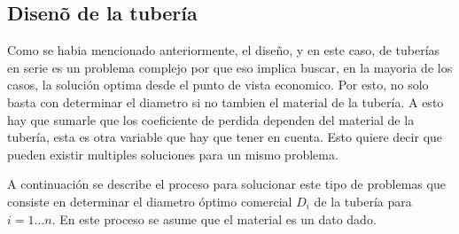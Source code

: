 \documentclass[11pt, oneside]{article}
\begin{document}
\subsection{Disen\~o de la  tuber\'ia}
Como se habia mencionado anteriormente, el dise\~no, y en este caso, de tuber\'ias en serie es un problema complejo por que eso implica buscar, en la mayoria de los casos, la soluci\'on optima desde el punto de vista economico. Por esto, no solo basta con determinar el diametro si no tambien el material de la tuber\'ia. A esto hay que sumarle que los coeficiente de perdida dependen del material de la tuber\'ia, esta es otra variable que hay que tener en cuenta. Esto quiere decir que pueden existir multiples soluciones para un mismo problema. 

A continuaci\'on se describe el proceso para solucionar este tipo de problemas que consiste en determinar el diametro \'optimo comercial $D_i$ de la tuber\'ia para $i=1...n$. En este proceso se asume que el material es un dato dado. 
\end{document}
